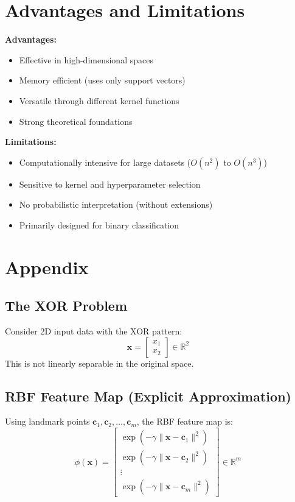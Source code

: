 \documentclass{tufte-handout}
\begin{document}
\section{Advantages and Limitations}

\textbf{Advantages:}
\begin{itemize}
    \item Effective in high-dimensional spaces
    \item Memory efficient (uses only support vectors)
    \item Versatile through different kernel functions
    \item Strong theoretical foundations
\end{itemize}

\textbf{Limitations:}
\begin{itemize}
    \item Computationally intensive for large datasets ($O(n^2)$ to $O(n^3)$)
    \item Sensitive to kernel and hyperparameter selection
    \item No probabilistic interpretation (without extensions)
    \item Primarily designed for binary classification
\end{itemize}

\section{Appendix}

\subsection{The XOR Problem}
Consider 2D input data with the XOR pattern:
\[
\mathbf{x} = \begin{bmatrix} x_1 \\ x_2 \end{bmatrix} \in \mathbb{R}^2
\]
This is not linearly separable in the original space.

\subsection{RBF Feature Map (Explicit Approximation)}
Using landmark points $\mathbf{c}_1, \mathbf{c}_2, \ldots, \mathbf{c}_m$, 
the RBF feature map is:
\[
\phi(\mathbf{x}) = \begin{bmatrix} 
\exp\left(-\gamma \|\mathbf{x} - \mathbf{c}_1\|^2\right) \\
\exp\left(-\gamma \|\mathbf{x} - \mathbf{c}_2\|^2\right) \\
\vdots \\
\exp\left(-\gamma \|\mathbf{x} - \mathbf{c}_m\|^2\right)
\end{bmatrix} \in \mathbb{R}^m
\]
\end{document}
